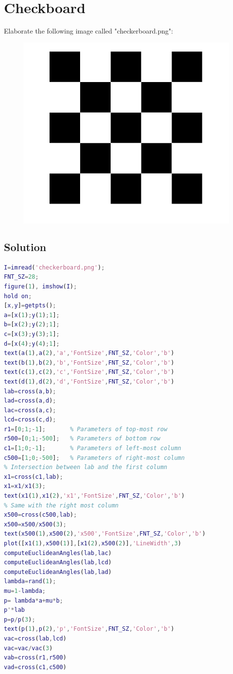 \documentclass[12pt, a4paper]{report}
\newtheorem[style=M,bodystyle=\normalfont]{theorem}{Theorem}
\newtheorem[style=M,bodystyle=\normalfont]{corollary}{Corollary}
\newtheorem[style=M,bodystyle=\normalfont]{lemma}{Lemma}
\newtheorem[style=M,bodystyle=\normalfont]{definition}{Definition}
\begin{document}
\section{Checkboard}
    Elaborate the following image called "checkerboard.png": 
    \begin{figure}[H]
        \centering
        \includegraphics[width=0.5\linewidth]{images/checkerboard.png}
    \end{figure}
\subsection*{Solution}

    \begin{lstlisting}[language=Matlab]
I=imread('checkerboard.png');
FNT_SZ=28;
figure(1), imshow(I);
hold on;
[x,y]=getpts();
a=[x(1);y(1);1];
b=[x(2);y(2);1];
c=[x(3);y(3);1];
d=[x(4);y(4);1];
text(a(1),a(2),'a','FontSize',FNT_SZ,'Color','b')
text(b(1),b(2),'b','FontSize',FNT_SZ,'Color','b')
text(c(1),c(2),'c','FontSize',FNT_SZ,'Color','b')
text(d(1),d(2),'d','FontSize',FNT_SZ,'Color','b')
lab=cross(a,b); 
lad=cross(a,d); 
lac=cross(a,c); 
lcd=cross(c,d);
r1=[0;1;-1];       % Parameters of top-most row
r500=[0;1;-500];   % Parameters of bottom row
c1=[1;0;-1];       % Parameters of left-most column
c500=[1;0;-500];   % Parameters of right-most column
% Intersection between lab and the first column
x1=cross(c1,lab); 
x1=x1/x1(3); 
text(x1(1),x1(2),'x1','FontSize',FNT_SZ,'Color','b')
% Same with the right most column
x500=cross(c500,lab);
x500=x500/x500(3);
text(x500(1),x500(2),'x500','FontSize',FNT_SZ,'Color','b')
plot([x1(1),x500(1)],[x1(2),x500(2)],'LineWidth',3)
computeEuclideanAngles(lab,lac) 
computeEuclideanAngles(lab,lcd) 
computeEuclideanAngles(lab,lad) 
lambda=rand(1);
mu=1-lambda;
p= lambda*a+mu*b;
p'*lab
p=p/p(3);
text(p(1),p(2),'p','FontSize',FNT_SZ,'Color','b')
vac=cross(lab,lcd)
vac=vac/vac(3) 
vab=cross(r1,r500)
vad=cross(c1,c500)
    \end{lstlisting}
\end{document}

